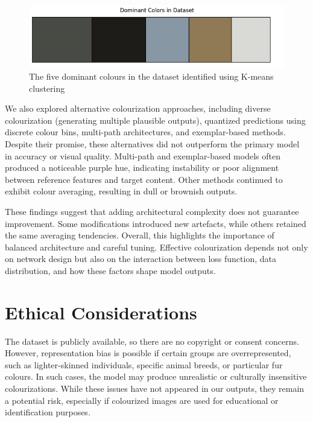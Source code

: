 \documentclass{article} %
\begin{document}
\begin{figure}[htbp]
  \centering
  \includegraphics[width=0.95\linewidth]{Figs/dom-colours.png}
  \caption{The five dominant colours in the dataset identified using K-means clustering}
  \label{fig:dom-colours}
\end{figure}

We also explored alternative colourization approaches, including diverse colourization (generating multiple plausible outputs), quantized predictions using discrete colour bins, 
multi-path architectures, and exemplar-based methods. Despite their promise, these alternatives did not outperform the primary model in accuracy or visual quality. Multi-path and 
exemplar-based models often produced a noticeable purple hue, indicating instability or poor alignment between reference features and target content. Other methods continued to exhibit 
colour averaging, resulting in dull or brownish outputs.

These findings suggest that adding architectural complexity does not guarantee improvement. Some modifications introduced new artefacts, while others retained the same averaging tendencies. 
Overall, this highlights the importance of balanced architecture and careful tuning. Effective colourization depends not only on network design but also on the interaction between loss 
function, data distribution, and how these factors shape model outputs.

\pagebreak

\section{Ethical Considerations}
\label{ethical}

The dataset is publicly available, so there are no copyright or consent concerns. However, representation bias is possible if certain groups are overrepresented, such as lighter-skinned 
individuals, specific animal breeds, or particular fur colours. In such cases, the model may produce unrealistic or culturally insensitive colourizations. While these issues have not appeared 
in our outputs, they remain a potential risk, especially if colourized images are used for educational or identification purposes.
\end{document}
